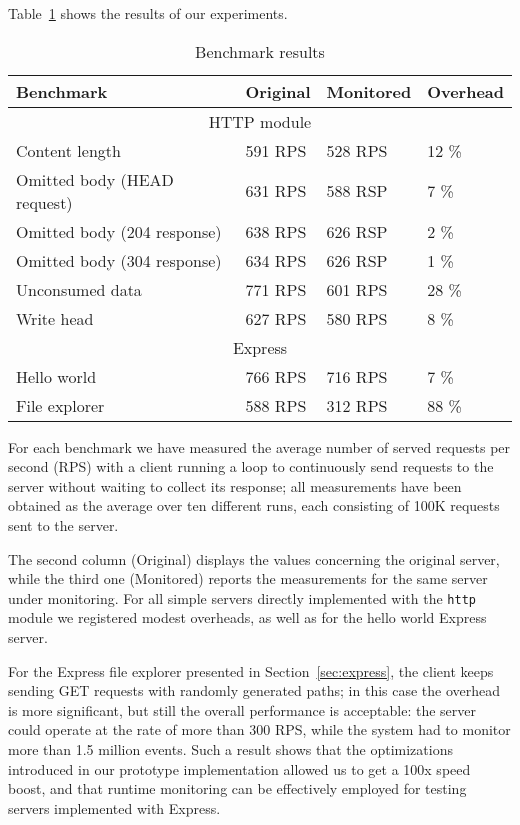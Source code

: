 Table~\ref{table} shows the results of our experiments. 
\begin{table}[ht]
  \begin{tabular}{|l|l|l|l|}
    \hline
    \textbf{Benchmark} & 
    \textbf{Original} &
    \textbf{Monitored} &
    \textbf{Overhead} \\
    \hline
    \multicolumn{4}{|c|}{HTTP module}\\
    \hline
    Content length & 
    591 RPS &
    528 RPS &
    12 \% \\

    Omitted body (HEAD request)&
    631 RPS &
    588 RSP &
    7 \% \\

    Omitted body (204 response)&
    638 RPS &
    626 RSP &
    2 \% \\

    Omitted body (304 response)&
    634 RPS &
    626 RSP &
    1 \% \\

    Unconsumed data &
     771 RPS &
     601 RPS &
     28 \% \\

    Write head &
    627 RPS &
    580 RPS &
    8 \% \\
    \hline

    \multicolumn{4}{|c|}{Express}\\
    \hline
    Hello world & 
    766 RPS &
    716 RPS &
    7 \% \\

    File explorer &
    588 RPS &
    312 RPS &
    88 \%\\

    \hline
  \end{tabular}
  \caption{Benchmark results}
  \label{table}
\end{table}
For each benchmark we have measured the average number of served requests per second (RPS) 
with a client running a loop to continuously send requests to the server without waiting to collect its response;
all measurements have been obtained as the average over ten different runs, each consisting
of 100K requests sent to the server.

The second column (Original) displays the values concerning the original server, while the third one
(Monitored) reports the measurements for the same server under monitoring.
For all simple servers directly implemented with the \lstinline{http} module we registered modest overheads, as well
as for the hello world Express server.

For the Express file explorer presented in Section~\ref{sec:express}, the client keeps sending GET requests
with randomly generated paths; in this case the overhead is more significant, but still the overall performance 
is acceptable: the server could operate at the rate of more than 300 RPS, while the system had to monitor more than 1.5 million events.
Such a result shows that the optimizations introduced in our prototype implementation allowed us
to get a 100x speed boost, and that runtime monitoring can be effectively employed for testing servers implemented with Express.
